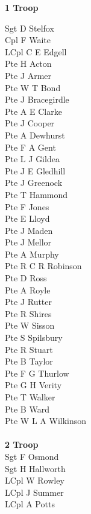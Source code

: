 \begin{center}
  \Large
  \textbf{1 Troop}
\end{center}

\begin{multicols}{2}
  \noindent
  Sgt D Stelfox \\
  Cpl F Waite \\
  LCpl C E Edgell \\
  Pte H Acton \\
  Pte J Armer \\
  Pte W T Bond \\
  Pte J Bracegirdle \\
  Pte A E Clarke \\
  Pte J Cooper \\
  Pte A Dewhurst \\
  Pte F A Gent \\
  Pte L J Gildea \\
  Pte J E Gledhill \\
  Pte J Greenock \\
  Pte T Hammond \\
  Pte F Jones \\
  Pte E Lloyd \\
  Pte J Maden \\
  Pte J Mellor \\
  Pte A Murphy \\
  Pte R C R Robinson \\
  Pte D Ross \\
  Pte A Royle \\
  Pte J Rutter \\
  Pte R Shires \\
  Pte W Sisson \\
  Pte S Spilsbury \\
  Pte R Stuart \\
  Pte B Taylor \\
  Pte F G Thurlow \\
  Pte G H Verity \\
  Pte T Walker \\
  Pte B Ward \\
  Pte W L A Wilkinson \\
  \\
  \textbf{2 Troop} \\
  Sgt F Osmond \\
  Sgt H Hallworth \\
  LCpl W Rowley \\
  LCpl J Summer \\
  LCpl A Potts \\

\end{multicols}
